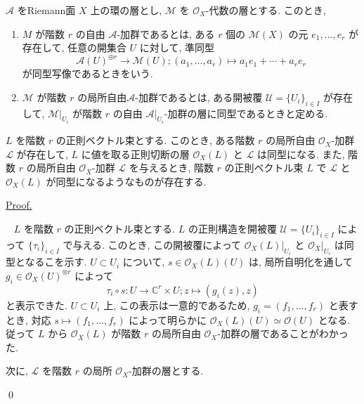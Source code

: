 \documentclass[a4paper,10pt,dvipdfmx]{jsreport}
\newenvironment{theorem*}{\refstepcounter{theorem}\begin{itembox}[l]{\underline{Theorem \arabic{chapter}.\arabic{section}.\arabic{theorem}.}}\vspace{-0.5zh}\ }{\end{itembox}}
\newenvironment{defi*}{\refstepcounter{theorem}\begin{itembox}[l]{\underline{Definition \arabic{chapter}.\arabic{section}.\arabic{theorem}.}}\vspace{-0.5zh}\ }{\end{itembox}}
\renewenvironment{proof}{\begin{flushleft} \underline{Proof.} \end{flushleft}\vspace{-1zh}\ }{\qed\\}
\newcounter{theorem}[section]
\theoremstyle{definition}
\begin{document}
\begin{defi*}
    \(\mathcal{A}\) をRiemann面 \(X\) 上の環の層とし, \(\mathcal{M}\) を \(\mathcal{O}_X\)-代数の層とする. このとき,
    \begin{enumerate}
        \item \(M\) が階数 \(r\) の自由 \(\mathcal{A}\)-加群であるとは, ある \(r\) 個の \(\mathcal{M}(X)\) の元 \(e_1,\ldots ,e_r\) が存在して, 任意の開集合 \(U\) に対して, 準同型
        \[
            \mathcal{A}(U)^{\oplus r} \to \mathcal{M}(U);(a_1,\ldots,a_r) \mapsto a_1 e_1 +\cdots +a_r e_r
        \]
        が同型写像であるときをいう.

        \item \(\mathcal{M}\) が階数 \(r\) の局所自由\(\mathcal{A}\)-加群であるとは, ある開被覆 \(\mathcal{U}=\{U_i\}_{i \in I}\) が存在して, \(\mathcal{M}|_{U_i}\) が階数 \(r\) の自由 \(\mathcal{A}|_{U_i}\)-加群の層に同型であるときと定める.
    \end{enumerate}
\end{defi*}

\begin{theorem*}
    \(L\) を階数 \(r\) の正則ベクトル束とする. このとき, ある階数 \(r\) の局所自由 \(\mathcal{O}_X\)-加群 \(\mathcal{L}\) が存在して, \(L\) に値を取る正則切断の層 \(\mathcal{O}_X(L)\) と \(\mathcal{L}\) は同型になる. また, 階数 \(r\) の局所自由 \(\mathcal{O}_X\)-加群 \(\mathcal{L}\) を与えるとき, 階数 \(r\) の正則ベクトル束 \(L\) で \(\mathcal{L}\) と \(\mathcal{O}_X(L)\) が同型になるようなものが存在する.
\end{theorem*}
\begin{proof}
    \(L\) を階数 \(r\) の正則ベクトル束とする. \(L\) の正則構造を開被覆 \(\mathcal{U} = \{U_i\}_{i\in I}\) によって \(\{\tau_i\}_{i\in I}\) で与える. このとき, この開被覆によって \(\mathcal{O}_X(L)|_{U_i}\) と \(\mathcal{O}_X|_{U_i}\) は同型となるこを示す. \(U\subset U_i\) について, \(s\in \mathcal{O}_X(L)(U)\) は, 局所自明化を通して \(g_i \in \mathcal{O}_X(U)^{\otimes r}\) によって
    \[
        \tau_i \circ s \colon U \to  \mathbb{C}^r \times U;z\mapsto (g_i(z),z)
    \]
    と表示できた. \(U\subset U_i\) 上, この表示は一意的であるため, \(g_i  = (f_1,\ldots,f_r)\) と表すとき, 対応 \(s \mapsto (f_1,\ldots,f_r)\) によって明らかに \(\mathcal{O}_X(L)(U) \simeq \mathcal{O}(U)\) となる. 従って \(L\) から \(\mathcal{O}_X(L)\) が階数 \(r\) の局所自由 \(\mathcal{O}_X\)-加群の層であることがわかった.

    次に, \(\mathcal{L}\) を階数 \(r\) の局所 \(\mathcal{O}_X\)-加群の層とする.

\end{proof}
\end{document}

